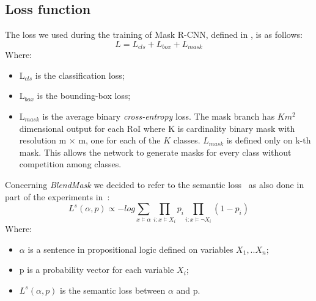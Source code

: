 \documentclass[10pt,twocolumn,letterpaper]{article}
\begin{document}
\subsection{Loss function}
The loss we used during the training of Mask R-CNN, defined in \cite{Authors1_maskrcnn}, is as follows:
\begin{equation}
L = L_{cls} + L_{box} + L_{mask} 
\label{loss_mask}
\end{equation}
Where:
\begin{itemize}
\item L$_{cls}$ is the classification loss;
\item L$_{box}$ is the bounding-box loss;
\item  L$_{mask}$ is the average binary \textit{cross-entropy} loss. The mask branch has $Km^2$ dimensional output for each RoI where K is cardinality binary mask with resolution m $\times$ m, one for each of the $K$ classes. $L_{mask}$ is defined only on k-th mask. This allows the network to generate masks for every class without competition among classes.
\end{itemize}
\noindent
Concerning \textit{BlendMask} we decided to refer to the semantic loss~\cite{Authors8_semanticloss} as also done in part of the experiments in~\cite{Authors2_BlendMask}:
\begin{equation}
L^s(\alpha, p) \propto - log \sum_{x \models \alpha} \prod_{i:x \models X_i} p_i \prod_{i:x \models \neg X_i} (1-p_i)
\label{Loss_semantic}
\end{equation}
Where:
\begin{itemize}
\item $\alpha$ is a sentence in propositional logic defined on variables $X_1,..X_n$;
\item p is a probability vector for each variable $X_i$;
\item $L^s(\alpha, p)$ is the semantic loss between $\alpha$ and p.
\end{itemize}
\end{document}
